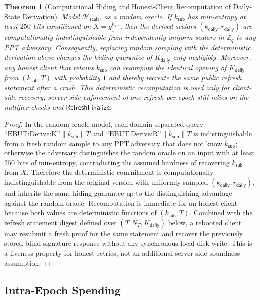 \documentclass[11pt]{article}
\theoremstyle{definitionstyle}
\newtheorem{theorem}{Theorem}[section]
\theoremstyle{plain}
\begin{document}
\begin{theorem}[Computational Hiding and Honest-Client Recomputation of Daily-State Derivation]
Model $\mathcal{H}_{\mathsf{scalar}}$ as a random oracle. If $k_{\mathsf{sub}}$ has min-entropy at least $250$ bits conditioned on $X = g_1^{k_{\mathsf{sub}}}$, then the derived scalars $(k_{\mathsf{daily}}, r_{\mathsf{daily}})$ are computationally indistinguishable from independently uniform scalars in $\mathbb{Z}_q$ to any PPT adversary. Consequently, replacing random sampling with the deterministic derivation above changes the hiding guarantee of $K_{\mathsf{daily}}$ only negligibly. Moreover, any honest client that retains $k_{\mathsf{sub}}$ can recompute the identical opening of $K_{\mathsf{daily}}$ from $(k_{\mathsf{sub}},T)$ with probability $1$ and thereby recreate the same public refresh statement after a crash. This deterministic recomputation is used only for client-side recovery; server-side enforcement of one refresh per epoch still relies on the nullifier checks and $\mathsf{RefreshFinalize}$.
\end{theorem}
\begin{proof}
In the random-oracle model, each domain-separated query $\text{``EBUT:Derive:K''} \parallel k_{\mathsf{sub}} \parallel T$ and $\text{``EBUT:Derive:R''} \parallel k_{\mathsf{sub}} \parallel T$ is indistinguishable from a fresh random sample to any PPT adversary that does not know $k_{\mathsf{sub}}$; otherwise the adversary distinguishes the random oracle on an input with at least $250$ bits of min-entropy, contradicting the assumed hardness of recovering $k_{\mathsf{sub}}$ from $X$. Therefore the deterministic commitment is computationally indistinguishable from the original version with uniformly sampled $(k_{\mathsf{daily}}, r_{\mathsf{daily}})$, and inherits the same hiding guarantee up to the distinguishing advantage against the random oracle. Recomputation is immediate for an honest client because both values are deterministic functions of $(k_{\mathsf{sub}},T)$. Combined with the refresh statement digest defined over $(T,N_T,K_{\mathsf{daily}})$ below, a rebooted client may resubmit a fresh proof for the same statement and recover the previously stored blind-signature response without any synchronous local disk write. This is a liveness property for honest retries, not an additional server-side soundness assumption.
\end{proof}

\subsection{Intra-Epoch Spending}
\end{document}
